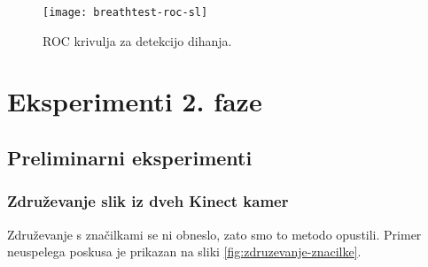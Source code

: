 \begin{figure}[!htbp]
	\centering
	\texttt{[image: breathtest-roc-sl]}
	\caption{ROC krivulja za detekcijo dihanja.}
	\label{fig:breathtest-roc}
\end{figure}




























\section{Eksperimenti 2. faze}
\subsection{Preliminarni eksperimenti}
\subsubsection{Združevanje slik iz dveh Kinect kamer}\label{sec:rezultati-zdruzevanje}
Združevanje s značilkami se ni obneslo, zato smo to metodo opustili. Primer neuspelega poskusa je prikazan na sliki \ref{fig:zdruzevanje-znacilke}.

